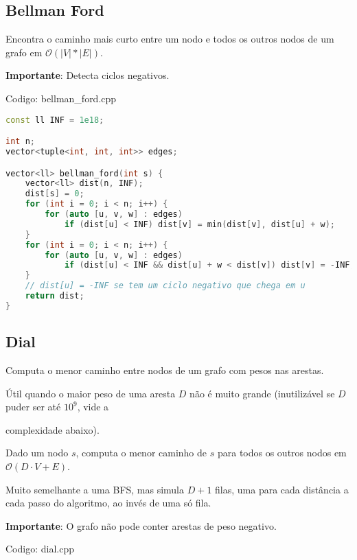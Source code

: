 \documentclass[10pt, a4paper, oneside]{book}
\begin{document}
\subsection{Bellman Ford}


Encontra o caminho mais curto entre um nodo e todos os outros nodos de um grafo em $\mathcal{O}(|V| * |E|)$.



\textbf{Importante}: Detecta ciclos negativos.

\hfill

Codigo: bellman\_ford.cpp

\begin{lstlisting}[language=C++]
const ll INF = 1e18;

int n;
vector<tuple<int, int, int>> edges;

vector<ll> bellman_ford(int s) {
    vector<ll> dist(n, INF);
    dist[s] = 0;
    for (int i = 0; i < n; i++) {
        for (auto [u, v, w] : edges)
            if (dist[u] < INF) dist[v] = min(dist[v], dist[u] + w);
    }
    for (int i = 0; i < n; i++) {
        for (auto [u, v, w] : edges)
            if (dist[u] < INF && dist[u] + w < dist[v]) dist[v] = -INF;
    }
    // dist[u] = -INF se tem um ciclo negativo que chega em u
    return dist;
}
\end{lstlisting}
\hfill

\subsection{Dial}


Computa o menor caminho entre nodos de um grafo com pesos nas arestas.



Útil quando o maior peso de uma aresta $D$ não é muito grande (inutilizável se $D$ puder ser até $10^9$, vide a

complexidade abaixo).



Dado um nodo $s$, computa o menor caminho de $s$ para todos os outros nodos em $\mathcal{O}(D \cdot V + E)$.



Muito semelhante a uma BFS, mas simula $D+1$ filas, uma para cada distância a cada passo do algoritmo, ao invés de uma só fila.



\textbf{Importante}: O grafo não pode conter arestas de peso negativo.

\hfill

Codigo: dial.cpp
\end{document}
